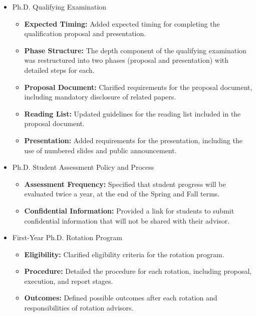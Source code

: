 \begin{itemize}[nosep]
  \item Ph.D. Qualifying Examination
\begin{itemize}[nosep]
  \item \textbf{Expected Timing:} Added expected timing for completing the qualification proposal and presentation.
  \item \textbf{Phase Structure:} The depth component of the qualifying examination was restructured into two phases (proposal and presentation) with detailed steps for each.
  \item \textbf{Proposal Document:} Clarified requirements for the proposal document, including mandatory disclosure of related papers.
  \item \textbf{Reading List:} Updated guidelines for the reading list included in the proposal document.
  \item \textbf{Presentation:} Added requirements for the presentation, including the use of numbered slides and public announcement.
\end{itemize}
\end{itemize}

\begin{itemize}[nosep]
  \item Ph.D. Student Assessment Policy and Process
\begin{itemize}[nosep]
  \item \textbf{Assessment Frequency:} Specified that student progress will be evaluated twice a year, at the end of the Spring and Fall terms.
  \item \textbf{Confidential Information:} Provided a link for students to submit confidential information that will not be shared with their advisor.
\end{itemize}
\end{itemize}

\begin{itemize}[nosep]
  \item First-Year Ph.D. Rotation Program
\begin{itemize}[nosep]
  \item \textbf{Eligibility:} Clarified eligibility criteria for the rotation program.
  \item \textbf{Procedure:} Detailed the procedure for each rotation, including proposal, execution, and report stages.
  \item \textbf{Outcomes:} Defined possible outcomes after each rotation and responsibilities of rotation advisors.
\end{itemize}
\end{itemize}

